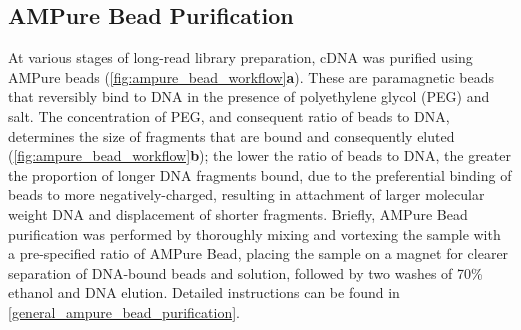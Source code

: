 \subsection{AMPure Bead Purification} 
\label{section:ch2_AMPure_explanation} 
At various stages of long-read library preparation, cDNA was purified using AMPure beads (\cref{fig:ampure_bead_workflow}\textbf{a}). These are paramagnetic beads that reversibly bind to DNA in the presence of polyethylene glycol (PEG) and salt. The concentration of PEG, and consequent ratio of beads to DNA, determines the size of fragments that are bound and consequently eluted (\cref{fig:ampure_bead_workflow}\textbf{b}); the lower the ratio of beads to DNA, the greater the proportion of longer DNA fragments bound, due to the preferential binding of beads to more negatively-charged, resulting in attachment of larger molecular weight DNA and displacement of shorter fragments. Briefly, AMPure Bead purification was performed by thoroughly mixing and vortexing the sample with a pre-specified ratio of AMPure Bead, placing the sample on a magnet for clearer separation of DNA-bound beads and solution, followed by two washes of 70\% ethanol and DNA elution. Detailed instructions can be found in \cref{general_ampure_bead_purification}.

